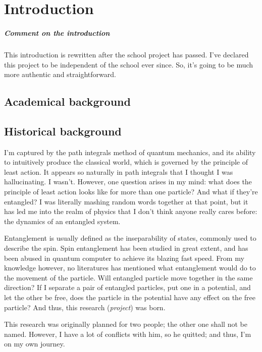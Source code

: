 \chapter{Introduction}

\paragraph{Comment on the introduction} This introduction is rewritten after the school project has passed. I've declared this project to be independent of the school ever since. So, it's going to be much more authentic and straightforward.

\section{Academical background}

\section{Historical background}

I'm captured by the path integrals method of quantum mechanics, and its ability to intuitively produce the classical world, which is governed by the principle of least action. It appears so naturally in path integrals that I thought I was hallucinating. I wasn't. However, one question arises in my mind: what does the principle of least action looks like for more than one particle? And what if they're entangled? I was literally mashing random words together at that point, but it has led me into the realm of physics that I don't think anyone really cares before: the dynamics of an entangled system.

Entanglement is usually defined as the inseparability of states, commonly used to describe the spin. Spin entanglement has been studied in great extent, and has been abused in quantum computer to achieve its blazing fast speed. From my knowledge however, no literatures has mentioned what entanglement would do to the movement of the particle. Will entangled particle move together in the same direction? If I separate a pair of entangled particles, put one in a potential, and let the other be free, does the particle in the potential have any effect on the free particle? And thus, this research (\emph{project}) was born.

This research was originally planned for two people; the other one shall not be named. However, I have a lot of conflicts with him, so he quitted; and thus, I'm on my own journey.